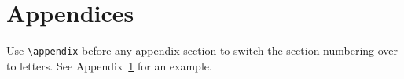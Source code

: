 \section{Appendices}
\label{sec:appendix}

Use \verb|\appendix| before any appendix section to switch the section numbering over to letters. See Appendix~\ref{sec:appendix} for an example.
